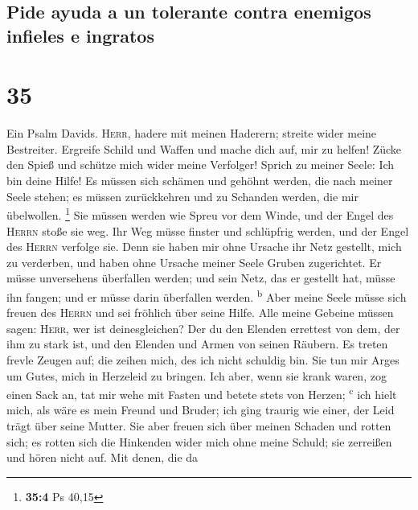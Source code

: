 \hypertarget{pide-ayuda-a-un-tolerante-contra-enemigos-infieles-e-ingratos}{%
\subsection{Pide ayuda a un tolerante contra enemigos infieles e
ingratos}\label{pide-ayuda-a-un-tolerante-contra-enemigos-infieles-e-ingratos}}

\hypertarget{section-34}{%
\section{35}\label{section-34}}

 Ein Psalm Davids. \textsc{Herr}, hadere mit meinen
Haderern; streite wider meine Bestreiter.  Ergreife Schild
und Waffen und mache dich auf, mir zu helfen!  Zücke den
Spieß und schütze mich wider meine Verfolger! Sprich zu meiner Seele:
Ich bin deine Hilfe!  Es müssen sich schämen und gehöhnt
werden, die nach meiner Seele stehen; es müssen zurückkehren und zu
Schanden werden, die mir übelwollen. \footnote{\textbf{35:4} Ps 40,15}
 Sie müssen werden wie Spreu vor dem Winde, und der Engel
des \textsc{Herrn} stoße sie weg.  Ihr Weg müsse finster
und schlüpfrig werden, und der Engel des \textsc{Herrn} verfolge sie.
 Denn sie haben mir ohne Ursache ihr Netz gestellt, mich
zu verderben, und haben ohne Ursache meiner Seele Gruben zugerichtet.
 Er müsse unversehens überfallen werden; und sein Netz,
das er gestellt hat, müsse ihn fangen; und er müsse darin überfallen
werden. \textsuperscript{b}  Aber meine Seele müsse sich
freuen des \textsc{Herrn} und sei fröhlich über seine Hilfe.
 Alle meine Gebeine müssen sagen: \textsc{Herr}, wer ist
deinesgleichen? Der du den Elenden errettest von dem, der ihm zu stark
ist, und den Elenden und Armen von seinen Räubern.  Es
treten frevle Zeugen auf; die zeihen mich, des ich nicht schuldig bin.
 Sie tun mir Arges um Gutes, mich in Herzeleid zu
bringen.  Ich aber, wenn sie krank waren, zog einen Sack
an, tat mir wehe mit Fasten und betete stets von Herzen;
\textsuperscript{c}  ich hielt mich, als wäre es mein
Freund und Bruder; ich ging traurig wie einer, der Leid trägt über seine
Mutter.  Sie aber freuen sich über meinen Schaden und
rotten sich; es rotten sich die Hinkenden wider mich ohne meine Schuld;
sie zerreißen und hören nicht auf.  Mit denen, die da
